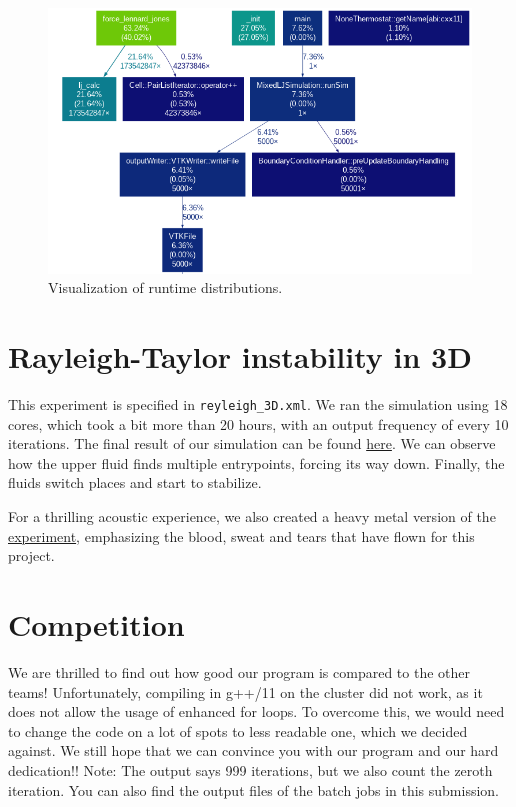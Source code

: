 \documentclass{article}
\begin{document}
\begin{figure}[H]
    \centering
    \includegraphics[width=1\textwidth]{../../res/optimized.png}
    \caption{Visualization of runtime distributions.}
    \label{fig:runtime}
\end{figure}

\section{Rayleigh-Taylor instability in 3D}
This experiment is specified in \texttt{reyleigh\_3D.xml}.
We ran the simulation using 18 cores, which took a bit more than 20 hours, with an output frequency of every 10 iterations.
The final result of our simulation can be found \href{https://www.youtube.com/watch?v=DXrORoIFdDM}{here}.
We can observe how the upper fluid finds multiple entrypoints, forcing its way down.
Finally, the fluids switch places and start to stabilize.


For a thrilling acoustic experience, we also created a heavy metal version of the \href{https://youtu.be/U99R1vSeBxQ}{experiment}, emphasizing the blood, sweat and tears that have flown for this project.

\section{Competition}
We are thrilled to find out how good our program is compared to the other teams!
Unfortunately, compiling in g++/11 on the cluster did not work, as it does not allow the usage of enhanced for loops.
To overcome this, we would need to change the code on a lot of spots to less readable one, which we decided against. 
We still hope that we can convince you with our program and our hard dedication!!
Note: The output says 999 iterations, but we also count the zeroth iteration. 
You can also find the output files of the batch jobs in this submission.
\end{document}
